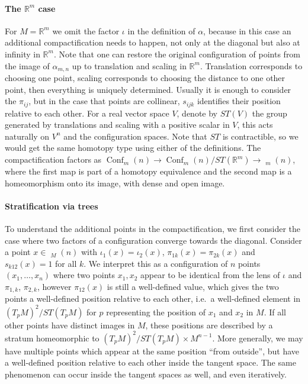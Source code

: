 \documentclass{scrartcl}
\theoremstyle{plain}
\theoremstyle{definition}
\newcommand{\R}{\mathbb R}
\DeclareMathOperator{\Conf}{Conf}
\DeclareMathOperator{\cConf}{\overline{Conf}}
\begin{document}
\paragraph{The $\R^m$ case} For $M = \R^m$ we omit the factor $\iota$ in the definition of $\alpha$, because in this case an additional compactification needs to happen, not only at the diagonal but also at infinity in $\R^m$. Note that one can restore the original configuration of points from the image of $\alpha_{m,n}$ up to translation and scaling in $\R^m$. Translation corresponds to choosing one point, scaling corresponds to choosing the distance to one other point, then everything is uniquely determined. Usually it is enough to consider the $\pi_{ij}$, but in the case that points are collinear, $s_{ijk}$ identifies their position relative to each other. For a real vector space $V$, denote by $ST(V)$ the group generated by translations and scaling with a positive scalar in $V$, this acts naturally on $V^n$ and the configuration spaces. Note that $ST$ is contractible, so we would get the same homotopy type using either of the definitions. The compactification factors as $\Conf_m(n) \to \Conf_m(n) / ST(\R^m) \to \cConf_m(n)$, where the first map is part of a homotopy equivalence and the second map is a homeomorphism onto its image, with dense and open image. 


\paragraph{Stratification via trees} To understand the additional points in the compactification, we first consider the case where two factors of a configuration converge towards the diagonal. Consider a point $x\in \cConf_M(n)$ with $\iota_1(x) = \iota_2(x)$, $\pi_{1k}(x) = \pi_{2k}(x)$ and $s_{k12}(x) = 1$ for all $k$. We interpret this as a configuration of $n$ points $(x_1, \dots, x_n)$ where two points $x_1, x_2$ appear to be identical from the lens of $\iota$ and $\pi_{1,k}$, $\pi_{2,k}$, however $\pi_{12}(x)$ is still a well-defined value, which gives the two points a well-defined position relative to each other, i.e.\ a well-defined element in $(T_{p}M)^2/ST(T_{p}M)$ for $p$ representing the position of $x_1$ and $x_2$ in $M$. If all other points have distinct images in $M$, these positions are described by a stratum homeomorphic to $(T_{p}M)^2/ST(T_{p}M) \times M^{n-1}$. More generally, we may have multiple points which appear at the same position ``from outside'', but have a well-defined position relative to each other inside the tangent space. The same phenomenon can occur inside the tangent spaces as well, and even iteratively. 
\end{document}
